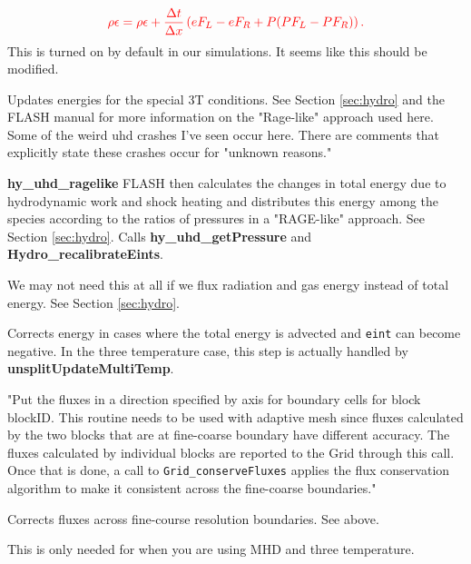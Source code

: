 \documentclass[preprint,11pt]{aastex}
\newcommand{\beq}{\begin{equation}}
\newcommand{\eeq}{\end{equation}}
\begin{document}
\begin{description}
\begin{description}
\begin{itemize}
			\beq
			{\color{red}
			\rho \epsilon = \rho \epsilon + \frac{\Delta t}{\Delta x} \left( eF_L - eF_R + P (PF_L - PF_R) \right).
			}
			\eeq
			This is turned on by default in our simulations. {\color{blue} It seems like this should be modified.}
		\end{itemize}
		{\color{red}\item[multiTemp/unsplitUpdateMultiTemp] Updates energies for the special 3T conditions.  See Section \ref{sec:hydro} and the FLASH manual for more information on the "Rage-like" approach used here.  Some of the weird uhd crashes I've seen occur here.  There are comments that explicitly state these crashes occur for "unknown reasons."}
		\begin{itemize}
			{\color{red} \item \textbf{hy\_uhd\_ragelike} FLASH then calculates the changes in total energy due to hydrodynamic work and shock heating and distributes this energy among the species according to the ratios of pressures in a "RAGE-like" approach.  See Section \ref{sec:hydro}.  Calls \textbf{hy\_uhd\_getPressure} and \textbf{Hydro\_recalibrateEints}.} {\color{blue} We may not need this at all if we flux radiation and gas energy instead of total energy.  See Section \ref{sec:hydro}.}
		\end{itemize}
		
		\item[energyFix] Corrects energy in cases where the total energy is advected and \verb!eint! can become negative.  In the three temperature case, this step is actually handled by \textbf{unsplitUpdateMultiTemp}.
		\item[Grid\_putFluxData] "Put the fluxes in a direction specified by axis for boundary cells for block blockID. This routine needs to be used with adaptive mesh since fluxes calculated by the two blocks that are at fine-coarse boundary have different accuracy. The fluxes calculated by individual blocks are reported to  the Grid through this call. Once that is done, a call to \verb!Grid_conserveFluxes! applies the flux conservation algorithm to make it consistent across the fine-coarse boundaries."
		\item[Grid\_conserveFluxes] Corrects fluxes across fine-course resolution boundaries.  See above.
		\item[Eos\_wrapped]
		\item[putGravityUnsplit]
		\item[addGravityUnsplit]
		\item[energyFix]
		\item[multiTempAfter] This is only needed for when you are using MHD and three temperature.

	
	\end{description}
	\end{description}
\end{document}
